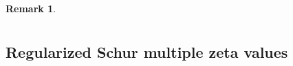 \documentclass[12pt]{amsart}%
\theoremstyle{definition}
\newtheorem{remark}[theorem]{Remark}
\begin{document}
\begin{remark}
\end{remark}

\appendix 

\section{}

\subsection{Regularized Schur multiple zeta values}
\end{document}
